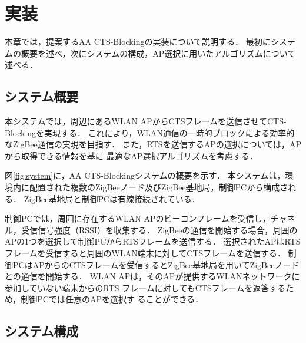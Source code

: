 \documentclass[12pt]{jreport}
\begin{document}
\chapter{実装}\label{implement}%
本章では，提案するAA CTS-Blockingの実装について説明する．
最初にシステムの概要を述べ，次にシステムの構成，AP選択に用いたアルゴリズムについて述べる．\\



\section{システム概要}

本システムでは，周辺にあるWLAN APからCTSフレームを送信させてCTS-Blockingを実現する．
これにより，WLAN通信の一時的ブロックによる効率的なZigBee通信の実現を目指す．
また，RTSを送信するAPの選択については，APから取得できる情報を基に
最適なAP選択アルゴリズムを考慮する．

図\ref{fig:system}に，AA CTS-Blockingシステムの概要を示す．
本システムは，環境内に配置された複数のZigBeeノード及びZigBee基地局，制御PCから構成される．
ZigBee基地局と制御PCは有線接続されている．

制御PCでは，周囲に存在するWLAN APのビーコンフレームを受信し，チャネル，受信信号強度（RSSI）を収集する．
ZigBeeの通信を開始する場合，周囲のAPの1つを選択して制御PCからRTSフレームを送信する．
選択されたAPはRTSフレームを受信すると周囲のWLAN端末に対してCTSフレームを送信する．
制御PCはAPからのCTSフレームを受信するとZigBee基地局を用いてZigBeeノードとの通信を開始する．
WLAN APは，そのAPが提供するWLANネットワークに参加していない端末からのRTS
フレームに対してもCTSフレームを返答するため，制御PCでは任意のAPを選択す
ることができる．

\section{システム構成}
\end{document}

